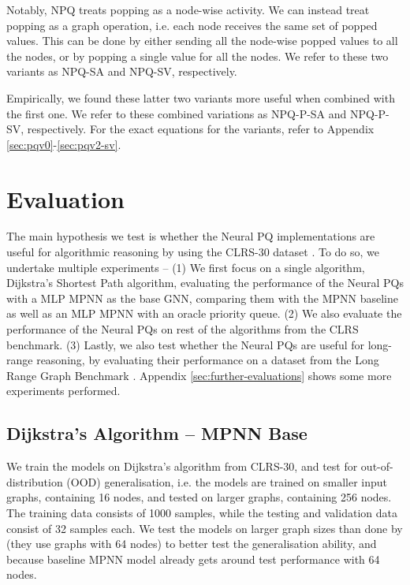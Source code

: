 \documentclass{article}
\theoremstyle{plain}
\theoremstyle{definition}
\theoremstyle{remark}
\begin{document}
Notably, NPQ treats popping as a node-wise activity. We can instead treat popping as a graph operation, i.e. each node receives the same set of popped values.
This can be done by either sending all the node-wise popped values to all the nodes, or by popping a single value for all the nodes. We refer to these two variants
as NPQ-SA and NPQ-SV, respectively.

Empirically, we found these latter two variants more useful when combined with the first one. We refer to these combined variations as NPQ-P-SA and NPQ-P-SV, respectively.
For the exact equations for the variants, refer to Appendix \ref{sec:pqv0}-\ref{sec:pqv2-sv}.

\section{Evaluation}
\label{sec:evaluation}
The main hypothesis we test is whether the Neural PQ implementations are useful for algorithmic reasoning by
using the CLRS-30 dataset \citep{Velickovic-CLRS}. To do so, we undertake multiple experiments --
(1) We first focus on a single algorithm, Dijkstra's Shortest Path algorithm, evaluating the performance
of the Neural PQs with a MLP MPNN as the base GNN, comparing them with the MPNN baseline as well as an
MLP MPNN with an oracle priority queue. (2) We also evaluate the performance
of the Neural PQs on rest of the algorithms from the CLRS benchmark. (3) Lastly,
we also test whether the Neural PQs are useful for long-range reasoning, by evaluating their performance on a dataset
from the Long Range Graph Benchmark \citep{Dwivedi-Long-Range-Benchmark}.
Appendix \ref{sec:further-evaluations} shows some more experiments performed.

\subsection{Dijkstra's Algorithm -- MPNN Base}
We train the models on Dijkstra's algorithm from CLRS-30, and test for out-of-distribution (OOD) generalisation, i.e.
the models are trained on smaller input graphs, containing 16 nodes, and tested on larger graphs,
containing 256 nodes. The training data consists of 1000 samples, while the testing and validation data consist of 32 samples each.
We test the models on larger graph sizes than done by
\citet{Velickovic-CLRS} (they use graphs with 64 nodes) to better
test the generalisation ability, and because baseline MPNN model already gets around  test
performance with 64 nodes.
\end{document}
